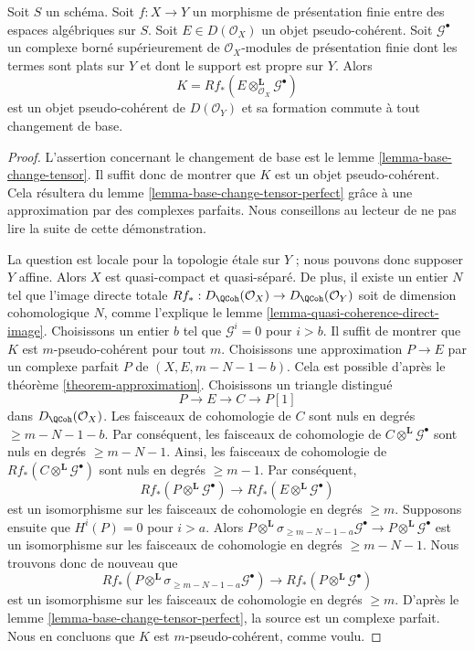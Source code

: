 \begin{lemma}
\label{lemma-base-change-tensor-pseudo-coherent}
Soit $S$ un schéma.
Soit $f : X \to Y$ un morphisme de présentation finie
entre des espaces algébriques sur $S$.
Soit $E \in D(\mathcal{O}_X)$ un objet pseudo-cohérent.
Soit $\mathcal{G}^\bullet$ un complexe borné supérieurement de
$\mathcal{O}_X$-modules de présentation finie dont les termes sont
plats sur $Y$ et dont le support est propre sur $Y$. Alors
$$
K = Rf_*(E \otimes_{\mathcal{O}_X}^\mathbf{L} \mathcal{G}^\bullet)
$$
est un objet pseudo-cohérent de $D(\mathcal{O}_Y)$ et sa formation
commute à tout changement de base.
\end{lemma}

\begin{proof}
L'assertion concernant le changement de base est le
lemme \ref{lemma-base-change-tensor}.
Il suffit donc de montrer que $K$ est un objet pseudo-cohérent.
Cela résultera du lemme \ref{lemma-base-change-tensor-perfect}
grâce à une approximation par des complexes parfaits. Nous conseillons au
lecteur de ne pas lire la suite de cette démonstration.

\medskip\noindent
La question est locale pour la topologie étale sur $Y$ ; nous pouvons donc
supposer $Y$ affine. Alors $X$ est quasi-compact et quasi-séparé. De plus, il
existe un entier $N$ tel que l'image directe totale
$Rf_* : D_\QCoh(\mathcal{O}_X) \to D_\QCoh(\mathcal{O}_Y)$
soit de dimension cohomologique $N$, comme l'explique le
lemme \ref{lemma-quasi-coherence-direct-image}.
Choisissons un entier $b$ tel que $\mathcal{G}^i = 0$ pour $i > b$.
Il suffit de montrer que $K$ est $m$-pseudo-cohérent pour
tout $m$. Choisissons une approximation $P \to E$ par un complexe parfait $P$
de $(X, E, m - N - 1 - b)$. Cela est possible d'après le
théorème \ref{theorem-approximation}.
Choisissons un triangle distingué
$$
P \to E \to C \to P[1]
$$
dans $D_\QCoh(\mathcal{O}_X)$. Les faisceaux de cohomologie de $C$ sont nuls
en degrés $\geq m - N - 1 - b$. Par conséquent, les faisceaux de cohomologie
de $C \otimes^\mathbf{L} \mathcal{G}^\bullet$ sont nuls en degrés
$\geq m - N - 1$.
Ainsi, les faisceaux de cohomologie de
$Rf_*(C \otimes^\mathbf{L} \mathcal{G}^\bullet)$ sont nuls en degrés $\geq m - 1$.
Par conséquent,
$$
Rf_*(P \otimes^\mathbf{L} \mathcal{G}^\bullet) \to
Rf_*(E \otimes^\mathbf{L} \mathcal{G}^\bullet)
$$
est un isomorphisme sur les faisceaux de cohomologie en degrés $\geq m$.
Supposons ensuite que $H^i(P) = 0$ pour $i > a$. Alors
$
P \otimes^\mathbf{L} \sigma_{\geq m - N - 1 - a}\mathcal{G}^\bullet
\longrightarrow
P \otimes^\mathbf{L} \mathcal{G}^\bullet
$
est un isomorphisme sur les faisceaux de cohomologie en degrés
$\geq m - N - 1$.
Nous trouvons donc de nouveau que
$$
Rf_*(P \otimes^\mathbf{L} \sigma_{\geq m - N - 1 - a}\mathcal{G}^\bullet) \to
Rf_*(P \otimes^\mathbf{L} \mathcal{G}^\bullet)
$$
est un isomorphisme sur les faisceaux de cohomologie en degrés $\geq m$.
D'après le lemme \ref{lemma-base-change-tensor-perfect}, la source
est un complexe parfait.
Nous en concluons que $K$ est $m$-pseudo-cohérent, comme voulu.
\end{proof}

